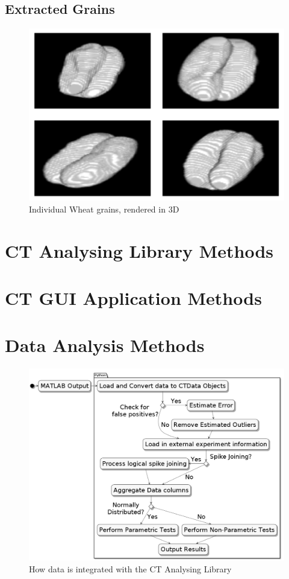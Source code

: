 \documentclass[11pt]{report}
\begin{document}
\subsection{Extracted Grains}
\label{sec:org683ef17}

\begin{figure}[htbp]
\centering
\includegraphics[width=13cm]{./images/ctgrains.png}
\caption{\label{fig:org8b0e2cf}
Individual Wheat grains, rendered in 3D}
\end{figure}

\section{CT Analysing Library Methods}
\label{sec:org6f6a808}
\section{CT GUI Application Methods}
\label{sec:org3252f11}
\section{Data Analysis Methods}
\label{sec:org27c1dcf}

\begin{figure}[htbp]
\centering
\includegraphics[width=13cm]{./images/pipeline.png}
\caption{\label{fig:org82afe43}
How data is integrated with the CT Analysing Library}
\end{figure}
\end{document}
